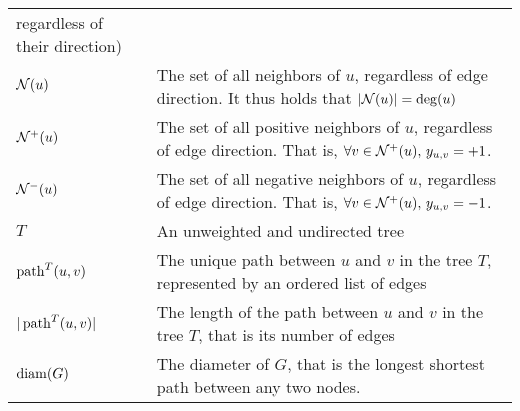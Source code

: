 \begin{table*}[thpb]
\begin{adjustwidth}{-2cm}{}
\begin{tabulary}{179mm}{LL}
    regardless of their direction) \\
    $\mathcal{N}(u)$ & The set of all neighbors of $u$, regardless of edge direction. It thus holds
    that $|\mathcal{N}(u)| = \operatorname{deg}(u)$ \\
    $\mathcal{N}^+(u)$ & The set of all positive neighbors of $u$, regardless of edge direction. That is,
    $\forall v \in \mathcal{N}^+(u),\, y_{u, v}{} = +1$. \\
    $\mathcal{N}^-(u)$ & The set of all negative neighbors of $u$, regardless of edge direction. That is,
    $\forall v \in \mathcal{N}^+(u),\, y_{u, v}{} = -1$. \\
    $T$ & An unweighted and undirected tree \\
    $\operatorname{path}^T(u, v)$ & The unique path between $u$ and $v$ in the tree $T$, represented by an ordered list of edges \\
    $|\operatorname{path}^T(u, v)|$ & The length of the path between $u$ and $v$ in the tree $T$, that is its number of edges \\
    $\operatorname{diam}(G)$ & The diameter of $G$, that is the longest shortest path between any two nodes. \\
    \bottomrule
  \end{tabulary}
\end{adjustwidth}
\end{table*}

